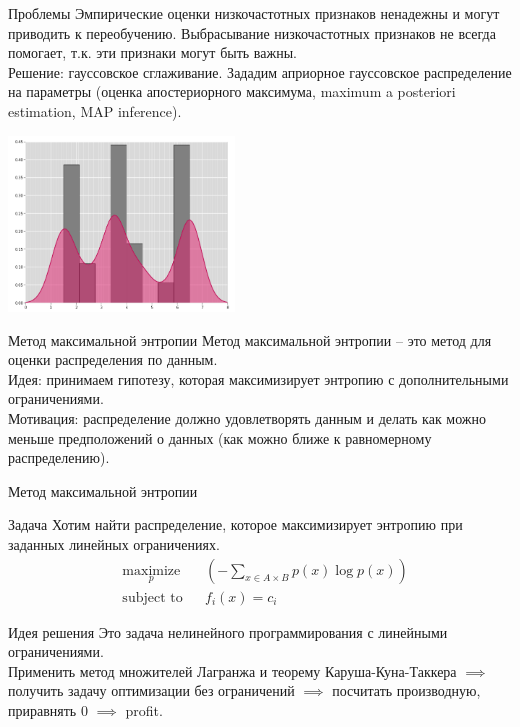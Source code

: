 \documentclass{beamer}
\begin{document}
\begin{frame}{Проблемы}
Эмпирические оценки низкочастотных признаков ненадежны и могут приводить к переобучению.
Выбрасывание низкочастотных признаков не всегда помогает, т.к. эти признаки могут быть важны.\\
Решение: гауссовское сглаживание. Зададим априорное гауссовское распределение на параметры (оценка апостериорного максимума, maximum a posteriori estimation, MAP inference).
\centerline{\includegraphics[width=6cm]{fig/gaussian_smoothing.png}}
\end{frame}

\begin{frame}{Метод максимальной энтропии}
Метод максимальной энтропии -- это метод для оценки распределения по данным.\\
Идея: принимаем гипотезу, которая максимизирует энтропию с дополнительными ограничениями.\\
Мотивация: распределение должно удовлетворять данным и делать как можно меньше предположений о данных (как можно ближе к равномерному распределению).
\end{frame}

\begin{frame}{Метод максимальной энтропии}
\begin{block}{Задача}
Хотим найти распределение, которое максимизирует энтропию при заданных линейных ограничениях.
\begin{equation*}
\begin{aligned}
& \underset{p}{\text{maximize}}
& & \left(-\sum_{x \in A \times B} p(x) \log p(x) \right) \\
& \text{subject to}
& & f_i(x) = c_i
\end{aligned}
\end{equation*}
\end{block}
\begin{block}{Идея решения}
Это задача нелинейного программирования с линейными ограничениями.\\
Применить метод множителей Лагранжа и теорему Каруша-Куна-Таккера $\implies$ получить задачу оптимизации без ограничений $\implies$ посчитать производную, приравнять 0 $\implies$ profit.
\end{block}
\end{frame}
\end{document}

